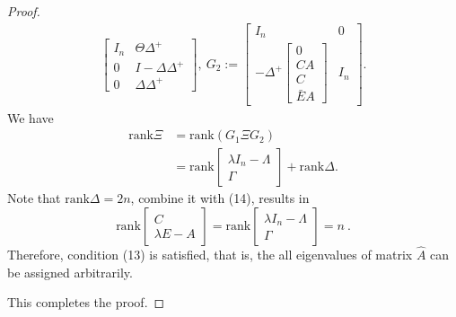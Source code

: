 \documentclass[english]{cccconf}
\theoremstyle{definition}
\newtheorem{remark}{Remark}
\begin{document}
\begin{proof}
\begin{align*}
\begin{bmatrix}
I_n&\Theta\Delta^+\\0&I-\Delta\Delta^+\\0&\Delta\Delta^+
\end{bmatrix},\ G_2:=\begin{bmatrix}
I_n&0\\-\Delta^+\begin{bmatrix}
0\\CA\\C\\\bar{E}A
\end{bmatrix}&I_n
\end{bmatrix}.
\end{align*}
We have
\begin{equation}\begin{split}
\textrm{rank}\Xi &=\textrm{rank}(G_1\Xi G_2)\\&=\textrm{rank}\begin{bmatrix}
\lambda I_n-\Lambda\\\Gamma
\end{bmatrix}+\textrm{rank}\Delta.
\end{split}\end{equation}
Note that $\textrm{rank}\Delta=2n$, combine it with (14), results in
\begin{equation}
\textrm{rank}\begin{bmatrix}
C\\\lambda E-A
\end{bmatrix}=\textrm{rank}\begin{bmatrix}
\lambda I_n-\Lambda\\\Gamma
\end{bmatrix}=n\ .
\end{equation}
Therefore, condition (13) is satisfied, that is, the all eigenvalues of matrix $\hat{A}$ can be assigned arbitrarily.

This completes the proof.
\end{proof}


\end{document}

